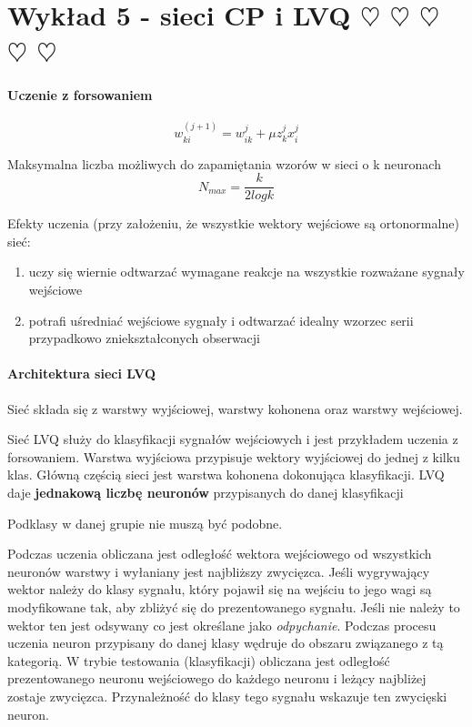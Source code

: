 \section{Wykład 5 - sieci CP i LVQ $\heartsuit$ $\heartsuit$ $\heartsuit$ $\heartsuit$ $\heartsuit$}

\paragraph{Uczenie z forsowaniem}

\begin{equation}
 w_{ki}^(j+1) = w_{ik}^j + \mu z_k^j x_i^j
\end{equation}

Maksymalna liczba możliwych do zapamiętania wzorów w sieci o k neuronach
\begin{equation}
 N_{max} = \frac{k}{2 log{k}}
\end{equation}

Efekty uczenia (przy założeniu, że wszystkie wektory wejściowe są ortonormalne) sieć:
\begin{enumerate}
 \item uczy się wiernie odtwarzać wymagane reakcje na wszystkie rozważane sygnały wejściowe
 \item potrafi uśredniać wejściowe sygnały i odtwarzać idealny wzorzec serii przypadkowo zniekształconych
 obserwacji
\end{enumerate}

\paragraph{Architektura sieci LVQ}

Sieć składa się z warstwy wyjściowej, warstwy kohonena oraz warstwy wejściowej. 

Sieć LVQ służy do klasyfikacji sygnałów wejściowych i jest przykładem uczenia z forsowaniem. 
Warstwa wyjściowa przypisuje wektory wyjściowej do jednej z kilku klas. Główną częścią sieci jest
warstwa kohonena dokonująca klasyfikacji. LVQ daje \textbf{jednakową liczbę neuronów} przypisanych do danej klasyfikacji

Podklasy w danej grupie nie muszą być podobne.

Podczas uczenia obliczana jest odległość wektora wejściowego od wszystkich neuronów warstwy i wyłaniany 
jest najbliższy zwycięzca. Jeśli wygrywający wektor należy do klasy sygnału, który pojawił się na wejściu
to jego wagi są modyfikowane tak, aby zbliżyć się do prezentowanego sygnału. Jeśli nie należy to wektor 
ten jest odsywany co jest określane jako \textit{odpychanie}. Podczas procesu uczenia neuron 
przypisany do danej klasy wędruje do obszaru związanego z tą kategorią.
W trybie testowania (klasyfikacji) obliczana jest odległość prezentowanego neuronu wejściowego 
do każdego neuronu i leżący najbliżej zostaje zwycięzca. Przynależność do klasy tego sygnału wskazuje
ten zwycięski neuron.

